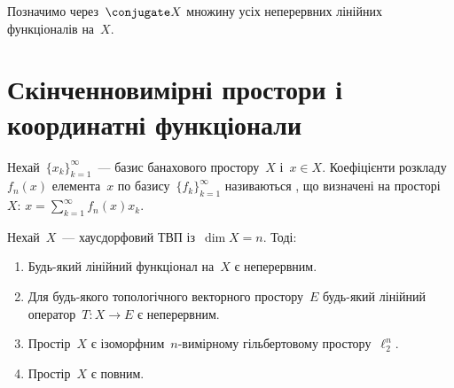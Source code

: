 Позначимо через~$\conjugate X$ множину усіх неперервних лінійних функціоналів на~$X$.

\section{Скінченновимірні простори і координатні функціонали}

\begin{definition}
    Нехай~$\{x_k\}_{k = 1}^\infty$~--- базис банахового простору~$X$ і~$x \in X$. Коефіцієнти розкладу~$f_n(x)$ елемента~$x$ по базису~$\{f_k\}_{k = 1}^\infty$ називаються , що визначені на просторі~$X$: $x = \sum_{k = 1}^\infty f_n(x) x_k$.
\end{definition}

\begin{theorem}
    \label{th:finite-dimensional-hausdorff-tvs-properties}
    Нехай~$X$~--- хаусдорфовий ТВП із~$\dim X = n$. Тоді:
    \begin{enumerate}
        \item Будь-який лінійний функціонал на~$X$ є неперервним.
        \item Для будь-якого топологічного векторного простору~$E$ будь-який лінійний оператор~$T: X \to E$ є неперервним.
        \item Простір~$X$ є ізоморфним~$n$-вимірному гільбертовому простору~$\ell_2^n$.
        \item Простір~$X$ є повним.
    \end{enumerate}
\end{theorem}

